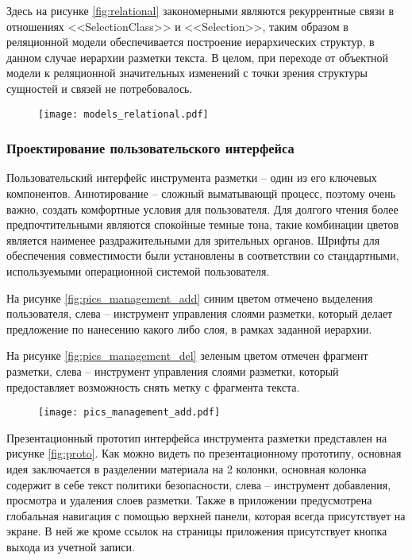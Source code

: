 \documentclass[../main]{subfiles}
\begin{document}
Здесь на рисунке \ref{fig:relational} закономерными являются рекуррентные связи в отношениях <<SelectionClass>> и <<Selection>>, таким образом в реляционной модели обеспечивается построение иерархических структур, в данном случае иерархии разметки текста. В целом, при переходе от объектной модели к реляционной значительных изменений с точки зрения структуры сущностей и связей не потребовалось.

\begin{figure}[H]
    \centering
    {\texttt{[image: models\_relational.pdf]}}
    \vspace{-\baselineskip}
\end{figure}

\subsubsection{Проектирование пользовательского интерфейса}
\label{sec:ui}

Пользовательский интерфейс инструмента разметки -- один из его ключевых компонентов. Аннотирование -- сложный выматывающй процесс, поэтому очень важно, создать комфортные условия для пользователя. Для долгого чтения более предпочтительными являются спокойные темные тона, такие комбинации цветов является наименее раздражительными для зрительных органов. Шрифты для обеспечения совместимости были установлены в соответствии со стандартными, используемыми операционной системой пользователя.  

На рисунке \ref{fig:pics_management_add} синим цветом отмечено выделения пользователя, слева -- инструмент управления слоями разметки, который делает предложение по нанесению какого либо слоя, в рамках заданной иерархии.

На рисунке \ref{fig:pics_management_del} зеленым цветом отмечен фрагмент разметки, слева -- инструмент управления слоями разметки, который предоставляет возможность снять метку с фрагмента текста.

\begin{figure}[H]
    \centering
    {\texttt{[image: pics\_management\_add.pdf]}}
    \vspace{-\baselineskip}
\end{figure}

Презентационный прототип интерфейса инструмента разметки представлен на рисунке \ref{fig:proto}. Как можно видеть по презентационному прототипу, основная идея заключается в разделении материала на 2 колонки, основная колонка содержит в себе текст политики безопасности, слева -- инструмент добавления, просмотра и удаления слоев разметки. Также в приложении предусмотрена глобальная навигация с помощью верхней панели, которая всегда присутствует на экране. В ней же кроме ссылок на страницы приложения присутствует кнопка выхода из учетной записи.
\end{document}
